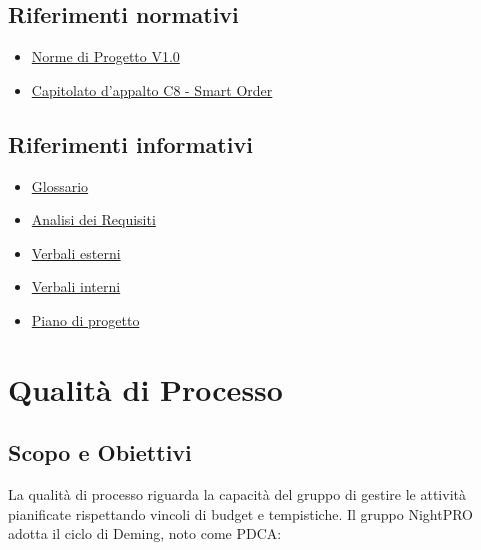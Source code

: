 \documentclass[a4paper,11pt,oneside]{scrartcl}
\begin{document}
\subsection{Riferimenti normativi}
\begin{itemize}
    \item \href{https://github.com/swenightpro/Documentazione/blob/main/docs/Candidatura/Documentazione%20Interna}{Norme di Progetto V1.0}
    \item \href{https://www.math.unipd.it/~tullio/IS-1/2025/Progetto/C8.pdf}{Capitolato d’appalto C8 - Smart Order}
\end{itemize}

\subsection{Riferimenti informativi}
\begin{itemize}
    \item \href{https://github.com/swenightpro/Documentazione/blob/main/docs/RTB/Documentazione%20Esterna}{Glossario}
    \item \href{https://github.com/swenightpro/Documentazione/tree/main/docs/RTB/Documentazione%20Esterna}{Analisi dei Requisiti}
    \item \href{https://github.com/swenightpro/Documentazione/tree/main/docs/RTB/Documentazione%20Esterna/Verbali%20Esterni}{Verbali esterni}
    \item \href{https://github.com/swenightpro/Documentazione/tree/main/docs/RTB/Documentazione%20Interna/Verbali%20Interni}{Verbali interni}
    \item \href{https://github.com/swenightpro/Documentazione/tree/main/docs/RTB/Documentazione%20Esterna}{Piano di progetto}
\end{itemize}

\newpage
\section{Qualità di Processo}

\subsection{Scopo e Obiettivi}
La qualità di processo riguarda la capacità del gruppo di gestire le attività pianificate rispettando vincoli di budget e tempistiche. Il gruppo NightPRO adotta il ciclo di Deming{\scriptsize{}}, noto come PDCA{\scriptsize{}}:
\end{document}
